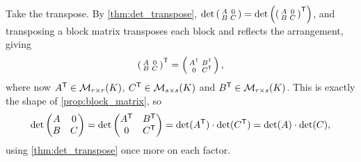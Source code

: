 \begin{exercisesolution}
\label{sol:block_lower}
Take the transpose. By \cref{thm:det_transpose}, $\det \left(\begin{smallmatrix} A & 0 \\ B & C \end{smallmatrix}\right) = \det \left( \left(\begin{smallmatrix} A & 0 \\ B & C \end{smallmatrix}\right)^{\mathsf{T}} \right)$, and transposing a block matrix transposes each block and reflects the arrangement, giving
\[
\left(\begin{smallmatrix} A & 0 \\ B & C \end{smallmatrix}\right)^{\mathsf{T}} = \left(\begin{smallmatrix} A^{\mathsf{T}} & B^{\mathsf{T}} \\ 0 & C^{\mathsf{T}} \end{smallmatrix}\right),
\]
where now $A^{\mathsf{T}} \in \mathcal{M}_{r \times r}(K)$, $C^{\mathsf{T}} \in \mathcal{M}_{s \times s}(K)$ and $B^{\mathsf{T}} \in \mathcal{M}_{r \times s}(K)$. This is exactly the shape of \cref{prop:block_matrix}, so
\[
\det \begin{pmatrix} A & 0 \\ B & C \end{pmatrix} = \det \begin{pmatrix} A^{\mathsf{T}} & B^{\mathsf{T}} \\ 0 & C^{\mathsf{T}} \end{pmatrix} = \det(A^{\mathsf{T}}) \cdot \det(C^{\mathsf{T}}) = \det(A) \cdot \det(C),
\]
using \cref{thm:det_transpose} once more on each factor.
\end{exercisesolution}



